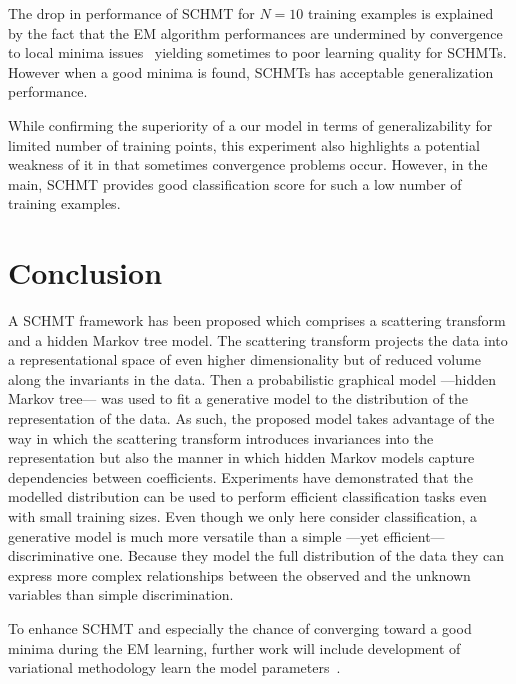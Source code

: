 \documentclass{article}
\begin{document}
		The drop in performance of SCHMT for $N=10$ training examples is explained by the fact that the EM algorithm performances are undermined by convergence to local minima issues~\cite{moon1996expectation} yielding sometimes to poor learning quality for SCHMTs. However when a good minima is found, SCHMTs has acceptable generalization performance. 
    
    While confirming the superiority of a our model in terms of generalizability for limited number of training points, this experiment also highlights a potential weakness of it in that sometimes convergence problems occur. However, in the main, SCHMT provides good classification score for such a low number of training examples.
		
\section{Conclusion}
  \label{sec:Conclusion}
  \vspace{-5pt}
  A SCHMT framework has been proposed which comprises a scattering transform and a hidden Markov tree model.  The scattering transform projects the data into a representational space of even higher dimensionality but of reduced volume along the invariants in the data. Then a probabilistic graphical model ---hidden Markov tree--- was used to fit a generative model to the distribution of the representation of the data.  As such, the proposed model takes advantage of the way in which the scattering transform introduces invariances into the representation but also the manner in which hidden Markov models capture dependencies between coefficients.  Experiments have demonstrated that the modelled distribution can be used to perform efficient classification tasks even with small training sizes. Even though we only here consider classification, a generative model is much more versatile than a simple ---yet efficient--- discriminative one. Because they model the full distribution of the data they can express more complex relationships between the observed and the unknown variables than simple discrimination. 
  
  To enhance SCHMT and especially the chance of converging toward a good minima during the EM learning, further work will include development of variational methodology learn the model parameters~\cite{wainwright2008graphical}.

  
\vfill
\pagebreak
\end{document}
